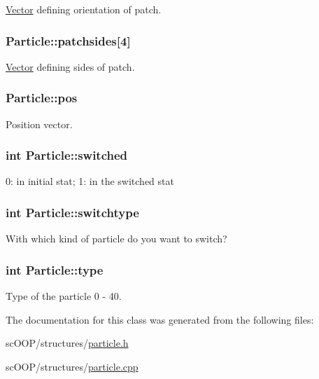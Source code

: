 \hyperlink{class_vector}{Vector} defining orientation of patch. 

\hypertarget{class_particle_a2c60d94c5664a2af5232373f08d74065}{
\subsubsection[{patchsides}]{ Particle\+::patchsides\mbox{[}4\mbox{]}}}\label{class_particle_a2c60d94c5664a2af5232373f08d74065}


\hyperlink{class_vector}{Vector} defining sides of patch. 

\hypertarget{class_particle_a257abdde975b38a8c6f5be812f18443f}{
\subsubsection[{pos}]{ Particle\+::pos}}\label{class_particle_a257abdde975b38a8c6f5be812f18443f}


Position vector. 

\hypertarget{class_particle_af14e7acdc74120025282ea901e11ef69}{
\subsubsection[{switched}]{\setlength{\rightskip}{0pt plus 5cm}int Particle\+::switched}}\label{class_particle_af14e7acdc74120025282ea901e11ef69}


0\+: in initial stat; 1\+: in the switched stat 

\hypertarget{class_particle_ae44cd3609cd01ff2e66edc58c64de10e}{
\subsubsection[{switchtype}]{\setlength{\rightskip}{0pt plus 5cm}int Particle\+::switchtype}}\label{class_particle_ae44cd3609cd01ff2e66edc58c64de10e}


With which kind of particle do you want to switch? 

\hypertarget{class_particle_a2b73dd42bcd56ba2e7ffeb0a5515a866}{
\subsubsection[{type}]{\setlength{\rightskip}{0pt plus 5cm}int Particle\+::type}}\label{class_particle_a2b73dd42bcd56ba2e7ffeb0a5515a866}


Type of the particle 0 -\/ 40. 



The documentation for this class was generated from the following files\+:\begin{DoxyCompactItemize}
\item 
sc\+O\+O\+P/structures/\hyperlink{particle_8h}{particle.\+h}\item 
sc\+O\+O\+P/structures/\hyperlink{particle_8cpp}{particle.\+cpp}\end{DoxyCompactItemize}
